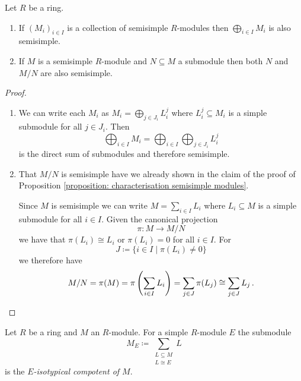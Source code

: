 \begin{lemma}\label{lemma: inherit semisimple}
  Let $R$ be a ring.
  \begin{enumerate}[label=\emph{\alph*)},leftmargin=*]
    \item
      If $(M_i)_{i \in I}$ is a collection of semisimple $R$-modules then $\bigoplus_{i \in I} M_i$ is also semisimple.
    \item
      If $M$ is a semisimple $R$-module and $N \subseteq M$ a submodule then both $N$ and $M/N$ are also semisimple.
  \end{enumerate}
\end{lemma}
\begin{proof}
  \begin{enumerate}[label=\emph{\alph*)},leftmargin=*]
    \item
      We can write each $M_i$ as $M_i = \bigoplus_{j \in J_i} L^j_i$ where $L^j_i \subseteq M_i$ is a simple submodule for all $j \in J_i$.
      Then
      \[
          \bigoplus_{i \in I} M_i
        = \bigoplus_{i \in I} \bigoplus_{j \in J_i} L^j_i
      \]
      is the direct sum of submodules and therefore semisimple.
    \item
      That $M/N$ is semisimple have we already shown in the claim of the proof of Proposition \ref{proposition: characterisation semisimple modules}.
      
      Since $M$ is semisimple we can write $M = \sum_{i \in I} L_i$ where $L_i \subseteq M$ is a simple submodule for all $i \in I$.
      Given the canonical projection
      \[
                \pi
        \colon  M
        \to     M / N
      \]
      we have that $\pi(L_i) \cong L_i$ or $\pi(L_i) = 0$ for all $i \in I$.
      For
      \[
                  J
        \coloneqq \{
                    i \in I
                  \mid
                    \pi(L_i) \neq 0
                  \}
      \]
      we therefore have
      \[
              M/N
        =     \pi(M)
        =     \pi\left( \sum_{i \in I} L_i \right)
        =     \sum_{j \in J} \pi(L_j)
        \cong \sum_{j \in J} L_j \,.
        \qedhere
      \]
  \end{enumerate}
\end{proof}


\begin{definition}
  Let $R$ be a ring and $M$ an $R$-module.
  For a simple $R$-module $E$ the submodule
  \[
              M_E
    \coloneqq \sum_{\substack{L \subseteq M \\ L \cong E}} L
  \]
  is the \emph{$E$-isotypical compotent of $M$}.
\end{definition}


